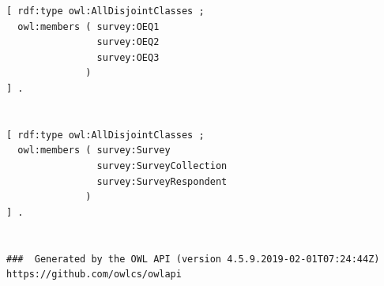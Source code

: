 \begin{lstlisting}
[ rdf:type owl:AllDisjointClasses ;
  owl:members ( survey:OEQ1
                survey:OEQ2
                survey:OEQ3
              )
] .


[ rdf:type owl:AllDisjointClasses ;
  owl:members ( survey:Survey
                survey:SurveyCollection
                survey:SurveyRespondent
              )
] .


###  Generated by the OWL API (version 4.5.9.2019-02-01T07:24:44Z) https://github.com/owlcs/owlapi

\end{lstlisting}
